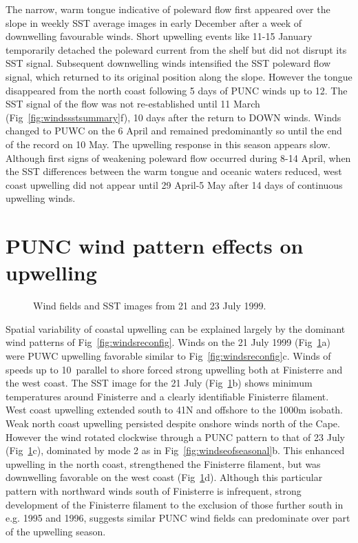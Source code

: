 The narrow, warm tongue indicative of poleward flow first appeared
over the slope in weekly SST average images in early December
after a week of downwelling favourable winds. Short upwelling
events like 11-15 January temporarily detached the poleward
current from the shelf but did not disrupt its SST signal.
Subsequent downwelling winds intensified the SST poleward flow
signal, which returned to its original position along the slope.
However the tongue disappeared from the north coast following 5
days of PUNC winds up to 12\vel. The SST signal of the flow was
not re-established until 11 March
(Fig~\ref{fig:windssstsummary}f), 10 days after the return to DOWN
winds. Winds changed to PUWC on the 6 April and remained
predominantly so until the end of the record on 10 May. The
upwelling response in this season appears slow. Although first
signs of weakening poleward flow occurred during 8-14 April, when
the SST differences between the warm tongue and oceanic waters
reduced, west coast upwelling did not appear until 29 April-5 May
after 14 days of continuous upwelling winds.


\section{PUNC wind pattern effects on upwelling}
\begin{figure}
\centering \noindent {}
 
\caption{ Wind fields and SST images from 21 and 23 July
1999.}\label{fig:windssst2123}
\end{figure}
Spatial variability of coastal upwelling can be explained largely
by the dominant wind patterns of Fig~\ref{fig:windsreconfig}.
Winds on the 21 July 1999 (Fig~\ref{fig:windssst2123}a) were PUWC
upwelling favorable similar to Fig~\ref{fig:windsreconfig}c. Winds
of speeds up to 10\vel\, parallel to shore forced strong upwelling
both at Finisterre and the west coast. The SST image for the 21
July (Fig~\ref{fig:windssst2123}b) shows minimum temperatures
around Finisterre and a clearly identifiable Finisterre filament.
West coast upwelling extended south to 41\deg N and offshore to
the 1000m isobath. Weak north coast upwelling persisted despite
onshore winds north of the Cape. However the wind rotated
clockwise through a PUNC pattern to that of 23 July
(Fig~\ref{fig:windssst2123}c), dominated by mode 2 as in
Fig~\ref{fig:windseofseasonal}b. This enhanced upwelling in the
north coast, strengthened the Finisterre filament, but was
downwelling favorable on the west coast
(Fig~\ref{fig:windssst2123}d). Although this particular pattern
with northward winds south of Finisterre is infrequent, strong
development of the Finisterre filament to the exclusion of those
further south in e.g. 1995 and 1996, suggests similar PUNC wind
fields can predominate over part of the upwelling season.


